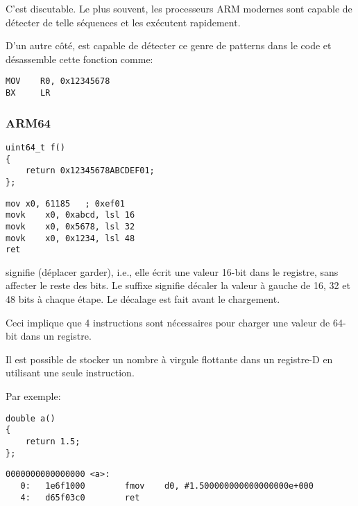 C'est discutable. Le plus souvent, les processeurs ARM modernes sont capable de détecter
de telle séquences et les exécutent rapidement.

D'un autre côté, \IDA est capable de détecter ce genre de patterns dans le code et
désassemble cette fonction comme:

\begin{lstlisting}[style=customasmARM]
MOV    R0, 0x12345678
BX     LR
\end{lstlisting}

\subsubsection{ARM64}

\begin{lstlisting}[style=customc]
uint64_t f()
{
	return 0x12345678ABCDEF01;
};
\end{lstlisting}

\begin{lstlisting}[caption=GCC 4.9.1 -O3,style=customasmARM]
mov	x0, 61185   ; 0xef01
movk	x0, 0xabcd, lsl 16
movk	x0, 0x5678, lsl 32
movk	x0, 0x1234, lsl 48
ret
\end{lstlisting}

 signifie  (déplacer garder), i.e., elle écrit une valeur
16-bit dans le registre, sans affecter le reste des bits.
Le suffixe  signifie décaler la valeur à gauche de 16, 32 et 48 bits à chaque
étape. Le décalage est fait avant le chargement.

Ceci implique que 4 instructions sont nécessaires pour charger une valeur de 64-bit
dans un registre.


Il est possible de stocker un nombre à virgule flottante dans un registre-D en utilisant
une seule instruction.

Par exemple:

\begin{lstlisting}[style=customc]
double a()
{
	return 1.5;
};
\end{lstlisting}

\begin{lstlisting}[caption=GCC 4.9.1 -O3 + objdump,style=customasmARM]
0000000000000000 <a>:
   0:   1e6f1000        fmov    d0, #1.500000000000000000e+000
   4:   d65f03c0        ret
\end{lstlisting}

